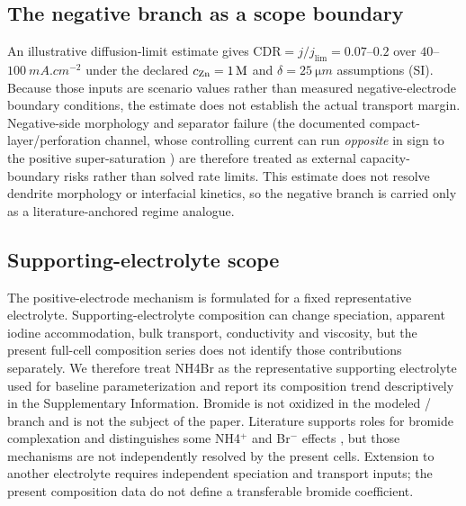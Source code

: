 \documentclass[11pt]{article}
\begin{document}
\subsection{The negative branch as a scope boundary}
An illustrative diffusion-limit estimate gives $\mathrm{CDR}=j/j_{\mathrm{lim}}=0.07$--$0.2$ over
$40$--$\SI{100}{mA.cm^{-2}}$ under the declared $c_{\ce{Zn}}=\SI{1}{M}$ and
$\delta=\SI{25}{\micro m}$ assumptions (SI). Because those inputs are scenario values rather than measured
negative-electrode boundary conditions, the estimate does not establish the actual transport margin.
Negative-side morphology and separator
failure (the documented compact-layer/perforation channel, whose controlling current can run \emph{opposite}
in sign to the positive super-saturation \citep{Richtr2026,Guo2025}) are therefore treated as external
capacity-boundary risks rather than solved rate limits. This estimate does not resolve dendrite morphology or
interfacial kinetics, so the negative branch is carried only as a literature-anchored regime analogue.

\subsection{Supporting-electrolyte scope}
\label{sec:chemaxis}
The positive-electrode mechanism is formulated for a fixed representative electrolyte. Supporting-electrolyte
composition can change speciation, apparent iodine accommodation, bulk transport, conductivity and viscosity,
but the present full-cell composition series does not identify those contributions separately. We therefore
treat NH4Br as the representative supporting electrolyte used for baseline parameterization and report its
composition trend descriptively in the Supplementary Information. Bromide is not oxidized in the modeled
/ branch and is not the subject of the paper. Literature supports roles for bromide complexation
and distinguishes some NH4$^+$ and Br$^-$ effects \citep{Jian2021,Park2021,Udom2025}, but those mechanisms are
not independently resolved by the present cells. Extension to another electrolyte requires independent
speciation and transport inputs; the present composition data do not define a transferable bromide
coefficient.
\end{document}
